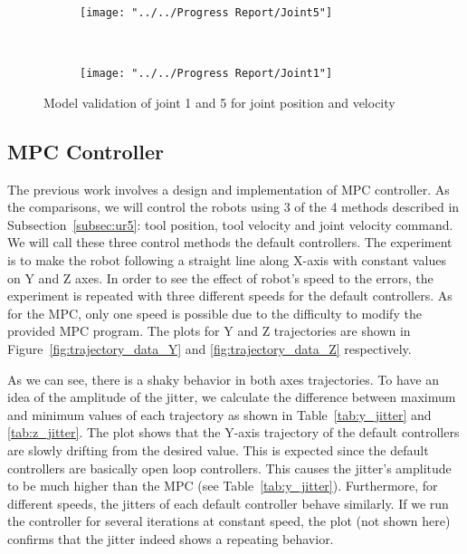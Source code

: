 \begin{figure}
	\centering
	\begin{subfigure}[b]{0.4\textwidth}
		\texttt{[image: "../../Progress Report/Joint5"]}
		\caption{}
		\label{fig:Joint5}
	\end{subfigure}%
	~ %
	\begin{subfigure}[b]{0.4\textwidth}
		\texttt{[image: "../../Progress Report/Joint1"]}
		\caption{}
		\label{fig:Joint1}
	\end{subfigure}
	\caption{Model validation of joint 1 and 5 for joint position and velocity}\label{fig:idenJoint}
\end{figure}

\newpage
\subsection{\ac{MPC} Controller}
The previous work involves a design and implementation of \ac {MPC} controller. As the comparisons, we will control the robots using 3 of the 4 methods described in Subsection~\ref{subsec:ur5}: tool position, tool velocity and joint velocity command. We will call these three control methods the default controllers. The experiment is to make the robot following a straight line along X-axis with constant values on Y and Z axes.  In order to see the effect of robot's speed to the errors, the experiment is repeated with three different speeds for the default controllers. As for the \ac {MPC}, only one speed is possible due to the difficulty to modify the provided \ac {MPC} program. The plots for Y and Z trajectories are shown in Figure~\ref{fig:trajectory_data_Y} and \ref{fig:trajectory_data_Z} respectively. 

As we can see, there is a shaky behavior in both axes trajectories. To have an idea of the amplitude of the jitter, we calculate the difference between maximum and minimum values of each trajectory as shown in Table~\ref{tab:y_jitter} and \ref{tab:z_jitter}. The plot shows that the Y-axis trajectory of the default controllers are slowly drifting from the desired value. This is expected since the default controllers are basically open loop controllers. This causes the jitter's amplitude to be much higher than the \ac {MPC} (see Table~\ref{tab:y_jitter}). Furthermore, for different speeds, the jitters of each default controller behave similarly. If we run the controller for several iterations at constant speed, the plot (not shown here) confirms that the jitter indeed shows a repeating behavior. 

